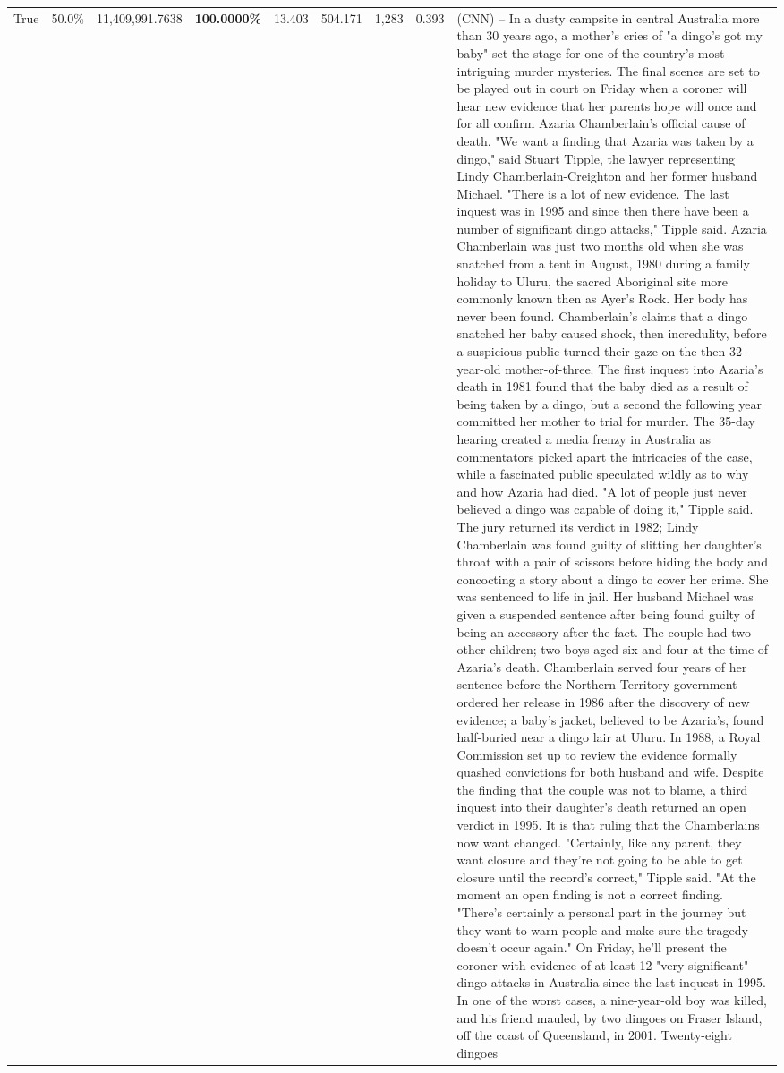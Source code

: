 \begin{table}[H]
\begin{tabular}{lllrlllll}
True & 50.0\% & 11,409,991.7638 & \bfseries \color{red} 100.0000\% & 13.403 & 504.171 & 1,283 & 0.393 & (CNN) -- In a dusty campsite in central Australia more than 30 years ago, a mother's cries of "a dingo's got my baby" set the stage for one of the country's most intriguing murder mysteries. The final scenes are set to be played out in court on Friday when a coroner will hear new evidence that her parents hope will once and for all confirm Azaria Chamberlain's official cause of death. "We want a finding that Azaria was taken by a dingo," said Stuart Tipple, the lawyer representing Lindy Chamberlain-Creighton and her former husband Michael. "There is a lot of new evidence. The last inquest was in 1995 and since then there have been a number of significant dingo attacks," Tipple said. Azaria Chamberlain was just two months old when she was snatched from a tent in August, 1980 during a family holiday to Uluru, the sacred Aboriginal site more commonly known then as Ayer's Rock. Her body has never been found. Chamberlain's claims that a dingo snatched her baby caused shock, then incredulity, before a suspicious public turned their gaze on the then 32-year-old mother-of-three. The first inquest into Azaria's death in 1981 found that the baby died as a result of being taken by a dingo, but a second the following year committed her mother to trial for murder. The 35-day hearing created a media frenzy in Australia as commentators picked apart the intricacies of the case, while a fascinated public speculated wildly as to why and how Azaria had died. "A lot of people just never believed a dingo was capable of doing it," Tipple said. The jury returned its verdict in 1982; Lindy Chamberlain was found guilty of slitting her daughter's throat with a pair of scissors before hiding the body and concocting a story about a dingo to cover her crime. She was sentenced to life in jail. Her husband Michael was given a suspended sentence after being found guilty of being an accessory after the fact. The couple had two other children; two boys aged six and four at the time of Azaria's death. Chamberlain served four years of her sentence before the Northern Territory government ordered her release in 1986 after the discovery of new evidence; a baby's jacket, believed to be Azaria's, found half-buried near a dingo lair at Uluru. In 1988, a Royal Commission set up to review the evidence formally quashed convictions for both husband and wife. Despite the finding that the couple was not to blame, a third inquest into their daughter's death returned an open verdict in 1995. It is that ruling that the Chamberlains now want changed. "Certainly, like any parent, they want closure and they're not going to be able to get closure until the record's correct," Tipple said. "At the moment an open finding is not a correct finding. "There's certainly a personal part in the journey but they want to warn people and make sure the tragedy doesn't occur again." On Friday, he'll present the coroner with evidence of at least 12 "very significant" dingo attacks in Australia since the last inquest in 1995. In one of the worst cases, a nine-year-old boy was killed, and his friend mauled, by two dingoes on Fraser Island, off the coast of Queensland, in 2001. Twenty-eight dingoes 
\end{tabular}
\end{table}
